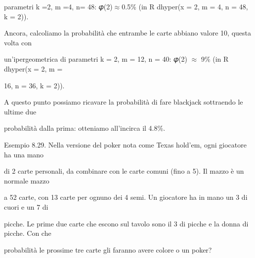 \documentclass[a4paper,portrait,12pt]{article}
\begin{document}
\begin{flushleft}
parametri k =2, m =4, n= 48: 𝜑(2)$\approx$0.5\% (in R dhyper(x = 2, m = 4, n = 48, k = 2)).
\end{flushleft}


\begin{flushleft}
Ancora, calcoliamo la probabilit\`{a} che entrambe le carte abbiano valore 10, questa volta con
\end{flushleft}


\begin{flushleft}
un'ipergeometrica di parametri k = 2, m = 12, n = 40: 𝜑(2) $\approx$ 9\% (in R dhyper(x = 2, m =
\end{flushleft}


\begin{flushleft}
16, n = 36, k = 2)).
\end{flushleft}


\begin{flushleft}
A questo punto possiamo ricavare la probabilit\`{a} di fare blackjack sottraendo le ultime due
\end{flushleft}


\begin{flushleft}
probabilit\`{a} dalla prima: otteniamo all'incirca il 4.8\%.
\end{flushleft}


\begin{flushleft}
Esempio 8.29. Nella versione del poker nota come Texas hold'em, ogni giocatore ha una mano
\end{flushleft}


\begin{flushleft}
di 2 carte personali, da combinare con le carte comuni (fino a 5). Il mazzo \`{e} un normale mazzo
\end{flushleft}


\begin{flushleft}
a 52 carte, con 13 carte per ognuno dei 4 semi. Un giocatore ha in mano un 3 di cuori e un 7 di
\end{flushleft}


\begin{flushleft}
picche. Le prime due carte che escono sul tavolo sono il 3 di picche e la donna di picche. Con che
\end{flushleft}


\begin{flushleft}
probabilit\`{a} le prossime tre carte gli faranno avere colore o un poker?
\end{flushleft}
\end{document}
